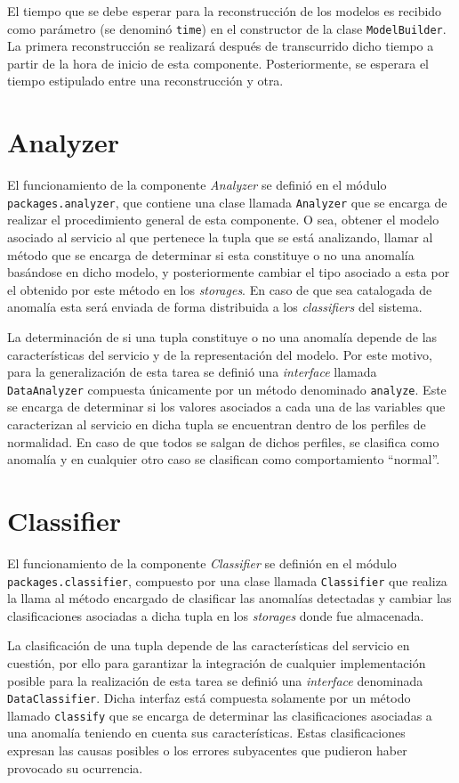El tiempo que se debe esperar para la reconstrucción de los modelos es recibido
como parámetro (se denominó \texttt{time}) en el constructor de la clase
\texttt{ModelBuilder}. La primera reconstrucción se realizará después de
transcurrido dicho tiempo a partir de la hora de inicio de esta componente.
Posteriormente, se esperara el tiempo estipulado entre una reconstrucción y
otra.

\section{Analyzer}
El funcionamiento de la componente \textit{Analyzer} se definió en el módulo
\texttt{packages.analyzer}, que contiene una clase llamada \texttt{Analyzer} que
se encarga de realizar el procedimiento general de esta componente. O sea,
obtener el modelo asociado al servicio al que pertenece la tupla que se está
analizando, llamar al método que se encarga de determinar si esta constituye o
no una anomalía basándose en dicho modelo, y posteriormente cambiar el tipo
asociado a esta por el obtenido por este método en los \textit{storages}. En
caso de que sea catalogada de anomalía esta será enviada de forma distribuida a
los \textit{classifiers} del sistema. 

La determinación de si una tupla constituye o no una anomalía depende de las
características del servicio y de la representación del modelo. Por este motivo,
para la generalización de esta tarea se definió una \textit{interface} llamada
\texttt{DataAnalyzer} compuesta únicamente por un método denominado
\texttt{analyze}. Este se encarga de determinar si los valores asociados a cada
una de las variables que caracterizan al servicio en dicha tupla se encuentran
dentro de los perfiles de normalidad. En caso de que todos se salgan de dichos
perfiles, se clasifica como anomalía y en cualquier otro caso se clasifican como
comportamiento ``normal''. 

\section{Classifier}
El funcionamiento de la componente \textit{Classifier} se definión en el módulo
\texttt{packages.classifier}, compuesto por una clase llamada
\texttt{Classifier} que realiza la llama al método encargado de clasificar las
anomalías detectadas y cambiar las clasificaciones asociadas a dicha tupla en
los \textit{storages} donde fue almacenada. 

La clasificación de una tupla depende de las características del servicio en
cuestión, por ello para garantizar la integración de cualquier implementación
posible para la realización de esta tarea se definió una \textit{interface}
denominada \texttt{DataClassifier}. Dicha interfaz está compuesta solamente por
un método llamado \texttt{classify} que se encarga de determinar las
clasificaciones asociadas a una anomalía teniendo en cuenta sus características.
Estas clasificaciones expresan las causas posibles o los errores subyacentes que
pudieron haber provocado su ocurrencia.


